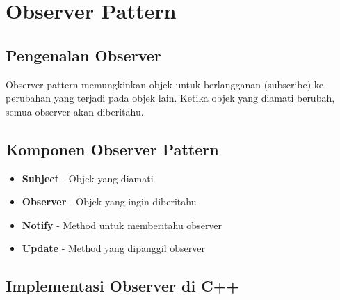 \section{Observer Pattern}

\subsection{Pengenalan Observer}

Observer pattern memungkinkan objek untuk berlangganan (subscribe) ke perubahan yang terjadi pada objek lain. Ketika objek yang diamati berubah, semua observer akan diberitahu.

\subsection{Komponen Observer Pattern}

\begin{itemize}
\item \textbf{Subject} - Objek yang diamati
\item \textbf{Observer} - Objek yang ingin diberitahu
\item \textbf{Notify} - Method untuk memberitahu observer
\item \textbf{Update} - Method yang dipanggil observer
\end{itemize}

\subsection{Implementasi Observer di C++}

